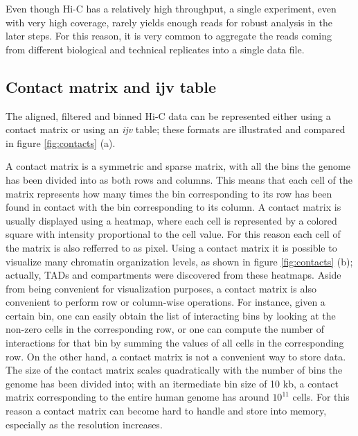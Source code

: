 Even though Hi-C has a relatively high throughput, a single experiment, even with very high coverage, rarely yields enough reads for robust analysis in the later steps. For this reason, it is very common to aggregate the reads coming from different biological and technical replicates into a single data file.

\subsection{Contact matrix and ijv table}

The aligned, filtered and binned Hi-C data can be represented either using a contact matrix or using an \emph{ijv} table; these formats are illustrated and compared in figure \ref{fig:contacts} (a).

A contact matrix is a symmetric and sparse matrix, with all the bins the genome has been divided into as both rows and columns. This means that each cell of the matrix represents how many times the bin corresponding to its row has been found in contact with the bin corresponding to its column. A contact matrix is usually displayed using a heatmap, where each cell is represented by a colored square with intensity proportional to the cell value. For this reason each cell of the matrix is also refferred to as pixel. Using a contact matrix it is possible to visualize many chromatin organization levels, as shown in figure \ref{fig:contacts} (b); actually, TADs and compartments were discovered from these heatmaps. Aside from being convenient for visualization purposes, a contact matrix is also convenient to perform row or column-wise operations. For instance, given a certain bin, one can easily obtain the list of interacting bins by looking at the non-zero cells in the corresponding row, or one can compute the number of interactions for that bin by summing the values of all cells in the corresponding row. On the other hand, a contact matrix is not a convenient way to store data. The size of the contact matrix scales quadratically with the number of bins the genome has been divided into; with an itermediate bin size of 10 kb, a contact matrix corresponding to the entire human genome has around $10^{11}$ cells. For this reason a contact matrix can become hard to handle and store into memory, especially as the resolution increases.

